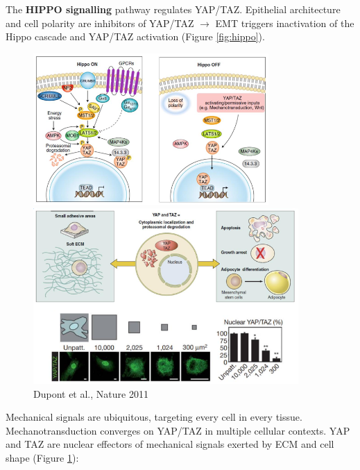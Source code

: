 The \textbf{HIPPO signalling} pathway regulates YAP/TAZ. Epithelial architecture and cell polarity are inhibitors of YAP/TAZ $\rightarrow$ EMT triggers inactivation of the Hippo cascade and YAP/TAZ activation (Figure \ref{fig:hippo}).

\begin{figure}[!htb]
   \begin{minipage}{0.48\textwidth}
     \centering
    \includegraphics[width=0.8\textwidth]{../_resources/Screen_Shot_2022-11-13_at_19-41-35.png}
\caption{}
\label{fig:hippo}
   \end{minipage}\hfill
   \begin{minipage}{0.48\textwidth}
     \centering
    \includegraphics[width=0.9\textwidth]{../_resources/Screen_Shot_2022-11-13_at_19-43-07.png}
\caption{Dupont et al., Nature 2011}
\label{fig:ecm}
   \end{minipage}
\end{figure}

Mechanical signals are ubiquitous, targeting every cell in every tissue. Mechanotransduction converges on YAP/TAZ in multiple cellular contexts. YAP and TAZ are nuclear effectors of mechanical signals exerted by ECM and cell shape (Figure \ref{fig:ecm}):

